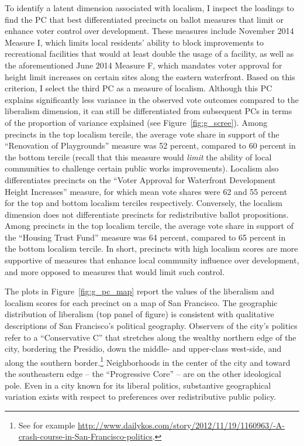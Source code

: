 \documentclass[article,11pt]{memoir}
\begin{document}
To identify a latent dimension associated with localism, I inspect the loadings to find the PC that best differentiated precincts on ballot measures that limit or enhance voter control over development.  These measures include November 2014 Measure I, which limits local residents' ability to block improvements to recreational facilities that would at least double the usage of a facility, as well as the aforementioned June 2014 Measure F, which mandates voter approval for height limit increases on certain sites along the eastern waterfront.  Based on this criterion, I select the third PC as a measure of localism. Although this PC explains significantly less variance in the observed vote outcomes compared to the liberalism dimension, it can still be differentiated from subsequent PCs in terms of the proportion of variance explained (see Figure~\ref{fig:g_scree}).  Among precincts in the top localism tercile, the average vote share in support of the ``Renovation of Playgrounds'' measure was 52 percent, compared to 60 percent in the bottom tercile (recall that this measure would \emph{limit} the ability of local communities to challenge certain public works improvements).  Localism also differentiates precincts on the ``Voter Approval for Waterfront Development Height Increases'' measure, for which mean vote shares were 62 and 55 percent for the top and bottom localism terciles respectively.  Conversely, the localism dimension does not differentiate precincts for redistributive ballot propositions.  Among precincts in the top localism tercile, the average vote share in support of the ``Housing Trust Fund'' measure was 64 percent, compared to 65 percent in the bottom localism tercile.  In short, precincts with high localism scores are more supportive of measures that enhance local community influence over development, and more opposed to measures that would limit such control.

The plots in Figure~\ref{fig:g_pc_map} report the values of the liberalism and localism scores for each precinct on a map of San Francisco. The geographic distribution of liberalism (top panel of figure) is consistent with qualitative descriptions of San Francisco's political geography. Observers of the city's politics refer to a ``Conservative C'' that stretches along the wealthy northern edge of the city, bordering the Presidio, down the middle- and upper-class west-side, and along the southern border.\footnote{See for example \url{http://www.dailykos.com/story/2012/11/19/1160963/-A-crash-course-in-San-Francisco-politics}.} Neighborhoods in the center of the city and toward the southeastern edge -- the ``Progressive Core'' -- are on the other ideological pole. Even in a city known for its liberal politics, substantive geographical variation exists with respect to preferences over redistributive public policy.
\end{document}
